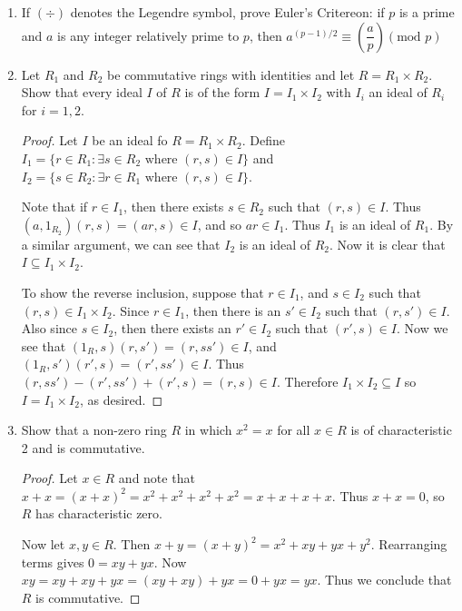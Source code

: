\documentclass{article}
\theoremstyle{definition}
\begin{document}
\begin{enumerate}
            \item If $(\div)$ denotes the Legendre symbol, prove Euler's Critereon: if $p$ is a prime and $a$ is any integer relatively prime to $p$, then $a^{(p-1)/2}\equiv \left(\dfrac{a}{p}\right) (\text{mod } p)$
            
            \item Let $R_1$ and $R_2$ be commutative rings with identities and let $R=R_1\times R_2$. Show that every ideal $I$ of $R$ is of the form $I=I_1\times I_2$ with $I_i$ an ideal of $R_i$ for $i=1,2$.
            
            \begin{proof}
                Let $I$ be an ideal fo $R=R_1\times R_2$. Define $I_1=\{r\in R_1:\exists s\in R_2 \text{ where } (r,s)\in I\}$ and $I_2=\{s\in R_2: \exists r \in R_1 \text{ where } (r,s)\in I\}$. 
                    
                Note that if $r\in I_1$, then there exists $s\in R_2$ such that $(r,s)\in I$. Thus $(a,1_{R_2})(r,s)=(ar,s)\in I$, and so $ar\in I_1$. Thus $I_1$ is an ideal of $R_1$. By a similar argument, we can see that $I_2$ is an ideal of $R_2$. Now it is clear that $I\subseteq I_1\times I_2$. 
                    
                To show the reverse inclusion, suppose that $r\in I_1$, and $s\in I_2$ such that $(r,s)\in I_1\times I_2$. Since $r\in I_1$, then there is an $s'\in I_2$ such that $(r,s')\in I$. Also since $s\in I_2$, then there exists an $r'\in I_2$ such that $(r',s)\in I$. Now we see that $(1_R,s)(r,s')=(r,ss')\in I$, and $(1_R,s')(r',s)=(r',ss')\in I$. Thus $(r,ss')-(r',ss')+(r',s)=(r,s)\in I$. Therefore $I_1\times I_2\subseteq I$ so $I=I_1\times I_2$, as desired.
            \end{proof}
            \item Show that a non-zero ring $R$ in which $x^2=x$ for all $x\in R$ is of characteristic 2 and is commutative.
                
            \begin{proof}
                Let $x\in R$ and note that $x+x=(x+x)^2=x^2+x^2+x^2+x^2=x+x+x+x$. Thus $x+x=0$, so $R$ has characteristic zero. 

                Now let $x,y\in R$. Then $x+y=(x+y)^2=x^2+xy+yx+y^2$. Rearranging terms gives $0=xy+yx$. Now $xy=xy+xy+yx=(xy+xy)+yx=0+yx=yx$. Thus we conclude that $R$ is commutative.
            \end{proof}
            

\end{enumerate}
\end{document}
